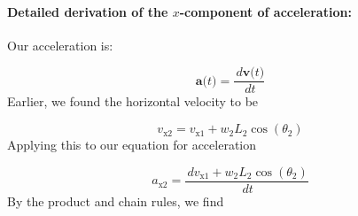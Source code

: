 \documentclass[12pt]{article}
\begin{document}
\paragraph{Detailed derivation of the $x$-component of acceleration:}
\label{GD:accelerationX2Deriv}
Our acceleration is:

\begin{displaymath}
\symbf{a}\text{(}t\text{)}=\frac{\,d\symbf{v}\text{(}t\text{)}}{\,dt}
\end{displaymath}
Earlier, we found the horizontal velocity to be

\begin{displaymath}
{v_{\text{x}2}}={v_{\text{x}1}}+{w_{2}} {L_{2}} \cos\left({θ_{2}}\right)
\end{displaymath}
Applying this to our equation for acceleration

\begin{displaymath}
{a_{\text{x}2}}=\frac{\,d{v_{\text{x}1}}+{w_{2}} {L_{2}} \cos\left({θ_{2}}\right)}{\,dt}
\end{displaymath}
By the product and chain rules, we find
\end{document}
